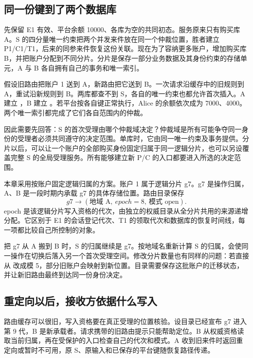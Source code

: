 \subsection*{同一份键到了两个数据库}

先保留 E1 有效、平台余额 10000、各库为空的共同初态。服务原来只有购买库 A。S 的四分量唯一约束把两个并发来件放在同一个仲裁位置，胜者建立 P1/C1/T1，后来的同参来件恢复这份关联。现在为了容纳更多账户，增加购买库 B，并把账户分配到不同分片。分片是保存一部分业务数据及其身份约束的存储单元，A 与 B 各自拥有自己的事务和唯一索引。

假设旧路由把账户 1 送到 A，新路由把它送到 B。一次请求沿缓存中的旧规则到 A，重试沿新规则到 B。两库都查不到 S，各自的唯一约束也都允许首次插入。A 建立 ，B 建立 。若平台按各自键正常执行，Alice 的余额依次成为 7000、4000。两个唯一索引都完成了它们各自范围内的仲裁。


因此需要先回答：S 的首次受理由哪个仲裁域决定？仲裁域是所有可能争夺同一身份的受理者必须共同遵守的决定范围。单库时，它由同一唯一约束及事务提供。分片以后，可以让一个账户的全部购买身份固定归属于同一逻辑分片，也可以另设覆盖完整 S 的全局受理服务。所有能够建立新 P/C 的入口都要进入所选的决定范围。

本章采用按账户固定逻辑归属的方案。账户 1 属于逻辑分片 g7。g7 是操作归属，A、B 是一段时期内承载 g7 的具体存储位置。路由目录保存
\[
g7\longrightarrow(\text{地域 A},\ epoch=8,\ \text{模式 open}).
\]
epoch 是该逻辑分片写入资格的代次，由独立的权威目录从全分片共用的来源递增分配。它区别于 E1 的会话登记代次、T1 的领取代次和数据库的恢复时间线，每一项都比较自己所控制的对象。

把 g7 从 A 搬到 B 时，S 的归属继续是 g7。按地域名重新计算 S 的归属，会使同一操作在切换后落入另一个首次受理空间。修改分片数量也有同样的问题：若直接从  改成模 5，部分旧账户会映射到新位置。目录需要保存这批账户的迁移状态，并让新旧路由最终到达同一份身份决定。

\subsection*{重定向以后，接收方依据什么写入}

路由缓存可以很旧，写入资格要在真正受理的位置核验。设目录已经宣布 g7 进入第 9 代，B 是新承载者。请求携带的旧路由提示只能帮助定位。B 从权威资格读取当前归属，再在受保护的入口检查自己的代次和模式。A 收到旧来件时返回重定向或暂时不可用，原 S、原输入和已保存的平台键随恢复路径传递。

